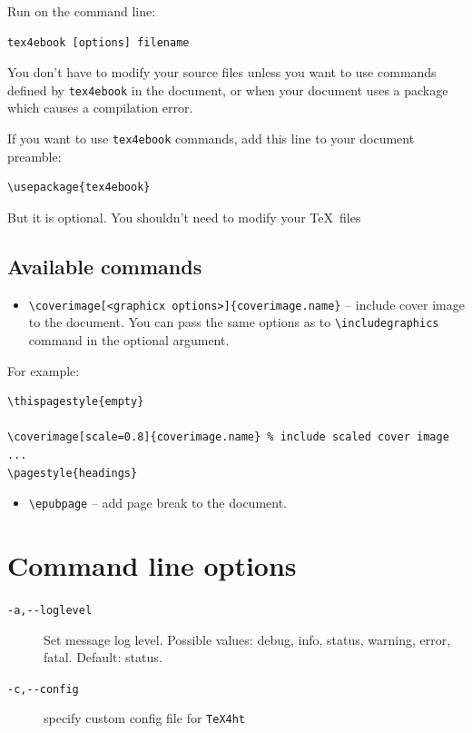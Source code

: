 Run on the command line:

\begin{verbatim}
tex4ebook [options] filename
\end{verbatim}

You don't have to modify your source files unless you want to use
commands defined by \texttt{tex4ebook} in the document, or when your
document uses a package which causes a compilation error.

If you want to use \texttt{tex4ebook} commands, add this line to your
document preamble:

\begin{verbatim}
\usepackage{tex4ebook}
\end{verbatim}

But it is optional. You shouldn't need to modify your \TeX~files

\subsection{Available commands}\label{available-commands}

\begin{itemize}
\tightlist
\item
  \texttt{\textbackslash{}coverimage{[}\textless{}graphicx\ options\textgreater{}{]}\{coverimage.name\}}
  -- include cover image to the document. You can pass the same options
  as to \texttt{\textbackslash{}includegraphics} command in the optional
  argument.
\end{itemize}

For example:

\begin{verbatim}
\thispagestyle{empty}

\coverimage[scale=0.8]{coverimage.name} % include scaled cover image
...
\pagestyle{headings}
\end{verbatim}

\begin{itemize}
\tightlist
\item
  \texttt{\textbackslash{}epubpage} -- add page break to the document.
\end{itemize}

\section{Command line options}\label{command-line-options}

\begin{description}
\item[\texttt{-a,-\/-loglevel}]
Set message log level. Possible values: debug, info, status, warning,
error, fatal. Default: status.
\item[\texttt{-c,-\/-config}]
specify custom config file for \texttt{TeX4ht}
\end{description}

